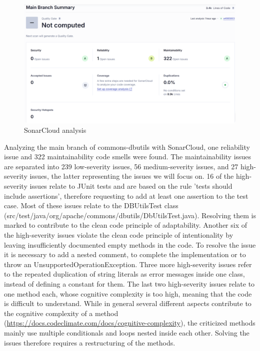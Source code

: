 \documentclass[sigconf]{acmart}
\begin{document}
\begin{figure}[H]
    \centering
    \includegraphics[width=1\linewidth]{images/sonarcloud.png}
    \caption{SonarCloud analysis}
\end{figure}

Analyzing the main branch of commons-dbutils with SonarCloud, one reliability issue and 322 maintainability code smells were found. The maintainability issues are separated into 239 low-severity issues, 56 medium-severity issues, and 27 high-severity issues, the latter representing the issues we will focus on. 
16 of the high-severity issues relate to JUnit tests and are based on the rule 'tests should include assertions', therefore requesting to add at least one assertion to the test case. Most of these issues relate to the DBUtilsTest class (src/test/java/org/apache/commons/dbutils/DbUtilsTest.java). Resolving them is marked to contribute to the clean code principle of adaptability. 
Another six of the high-severity issues violate the clean code principle of intentionality by leaving insufficiently documented empty methods in the code. To resolve the issue it is necessary to add a nested comment, to complete the implementation or to throw an UnsupportedOperationException.
Three more high-severity issues refer to the repeated duplication of string literals as error messages inside one class, instead of defining a constant for them. 
The last two high-severity issues relate to one method each, whose cognitive complexity is too high, meaning that the code is difficult to understand. While in general several different aspects contribute to the cognitive complexity of a method (\url{https://docs.codeclimate.com/docs/cognitive-complexity}), the criticized methods mainly use multiple conditionals and loops nested inside each other. Solving the issues therefore requires a restructuring of the methods.
\end{document}
